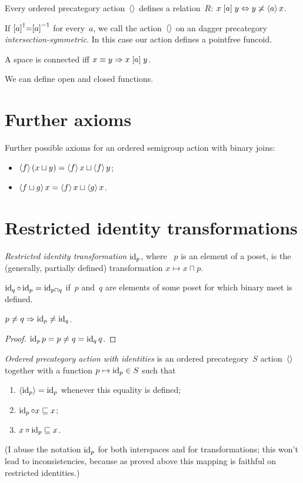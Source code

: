 Every ordered precategory action~$\left\langle \right\rangle$ defines a relation~$R$: $x\mathrel{\left[a\right]}y\Leftrightarrow y\not\asymp\left\langle a\right\rangle x$.

If $\mathrel{\left[a\right]}^{\dagger}=\mathrel{\left[a\right]}^{-1}$ for every~$a$, we call the action~$\left\langle \right\rangle$ on an dagger precategory \emph{inter\-sec\-tion-sym\-met\-ric}. In this case our action defines a pointfree funcoid.

A space is connected iff $x\equiv y\Rightarrow x\mathrel{\left[a\right]}y$.

We can define open and closed functions.

\chapter{Further axioms}

Further possible axioms for an ordered semigroup action with binary joins:

\begin{itemize}
\item $\left\langle f\right\rangle(x\sqcup y)=\left\langle f\right\rangle x\sqcup\left\langle f\right\rangle y$;
\item $\left\langle f\sqcup g\right\rangle x=\left\langle f\right\rangle x\sqcup\left\langle g\right\rangle x$.
\end{itemize}


\chapter{Restricted identity transformations}

\emph{Restricted identity transformation} $\operatorname{id}_p$, where ~$p$ is an element of a poset, is the (generally, partially defined) transformation $x\mapsto x\sqcap p$.

\begin{obvious}
$\operatorname{id}_q\circ\operatorname{id}_p = \operatorname{id}_{p\sqcap q}$ if~$p$ and~$q$ are elements of some poset for which binary meet is defined.
\end{obvious}

\begin{prop}
$p\ne q\Rightarrow\operatorname{id}_p\ne\operatorname{id}_q$.
\end{prop}

\begin{proof}
$\operatorname{id}_p p=p \ne q = \operatorname{id}_q q$.
\end{proof}

\emph{Ordered precategory action with identities} is an ordered precategory~$S$ action~$\left\langle \right\rangle$ together with a function $p\mapsto\operatorname{id}_p\in S$ such that
\begin{enumerate}
\item $\left\langle \operatorname{id}_p\right\rangle=\operatorname{id}_p$ whenever this equality is defined;
\item $\operatorname{id}_p\circ x\sqsubseteq x$;
\item $x\circ\operatorname{id}_p\sqsubseteq x$.
\end{enumerate}
(I abuse the notation $\operatorname{id}_p$ for both interspaces and for transformations; this won't lead to inconsistencies, because as proved above this mapping is faithful on restricted identities.)

